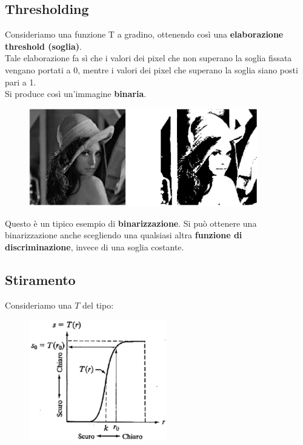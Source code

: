 \subsection{Thresholding}

Consideriamo una funzione T a gradino, ottenendo così una \textbf{elaborazione
    threshold (soglia)}.\\
Tale elaborazione fa sì che i valori dei pixel che non superano la soglia
fissata vengano portati a 0, mentre i valori dei pixel che superano la soglia
siano posti pari a 1.\\
Si produce così un'immagine \textbf{binaria}.

\begin{figure}[H]
    \centering
    \includegraphics[width=10cm, keepaspectratio]{capitoli/immagini/imgs/foto_esempio_1.jpg}
\end{figure}

Questo è un tipico esempio di \textbf{binarizzazione}. Si può ottenere una
binarizzazione anche scegliendo una qualsiasi altra \textbf{funzione di
    discriminazione}, invece di una soglia costante.

\subsection{Stiramento}

Consideriamo una $T$ del tipo:

\begin{figure}[H]
    \centering
    \includegraphics[width=6cm, keepaspectratio]{capitoli/immagini/imgs/trasformazione_esempio_2.jpg}
\end{figure}

